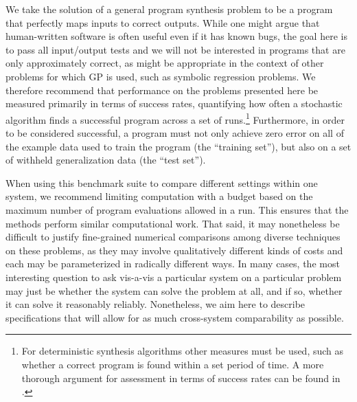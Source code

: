 \documentclass{sig-alternate}
\begin{document}
We take the solution of a general program synthesis problem to be a program that perfectly maps inputs to correct outputs. While one might argue that human-written software is often useful even if it has known bugs, the goal here is to pass all input/output tests and we will  not be interested in  programs that are only approximately correct, as might be appropriate in the context of other problems for which GP is used, such as symbolic regression problems. We therefore recommend that performance on the problems presented here be measured primarily in terms of success rates, quantifying how often a stochastic algorithm finds a successful program across a set of runs.\footnote{For deterministic synthesis algorithms other measures must be used, such as whether a correct program is found within a set period of time. A more thorough argument for assessment in terms of success rates can be found in \cite{Helmuth:2014:GECCO}.}
Furthermore, in order to be considered successful, a program must not only achieve zero error on all of the example data used to train the program (the ``training set''), but also on a set of withheld generalization data (the ``test set''). 





When using this benchmark suite to compare different settings within one system, we recommend limiting computation with a budget based on the maximum number of program evaluations allowed in a run. This ensures that the methods perform similar computational work. That said, it may nonetheless be difficult to justify fine-grained numerical comparisons among diverse techniques on these problems, as they may involve qualitatively different kinds of costs and each may be parameterized in radically different ways. In many cases, the most interesting question to ask vis-a-vis a particular system on a particular problem may just be whether the system can solve the problem at all, and if so,  whether it can solve it reasonably reliably. Nonetheless, we aim here to describe specifications that will allow for as much cross-system comparability as possible. %
\end{document}
